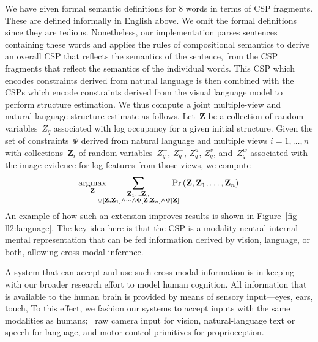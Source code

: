 \par\noindent
We have given formal semantic definitions for $8$ words in terms of CSP
fragments.
%
These are defined informally in English above.
%
We omit the formal definitions since they are tedious.
%
Nonetheless, our implementation parses sentences containing these words and
applies the rules of compositional semantics to derive an overall CSP that
reflects the semantics of the sentence, from the CSP fragments that reflect the
semantics of the individual words.
%
This CSP which encodes constraints derived from natural language is then
combined with the CSPs which encode constraints derived from the visual
language model to perform structure estimation.
%
We thus compute a joint multiple-view and natural-language structure estimate
as follows.
%
Let~$\mathbf{Z}$ be a collection of random variables~$Z_q$ associated with log
occupancy for a given initial structure.
%
Given the set of constraints~$\Psi$ derived from natural language
and multiple views $i=1,\ldots,n$ with collections~$\mathbf{Z}_i$ of random
variables~$Z^+_q$, $Z^-_q$, $Z^u_q$, $Z^v_q$, and~$Z^w_q$ associated with the
image evidence for log features from those views, we compute
%
\begin{equation*}
  \argmax_{\mathbf{Z}}\hspace{-12pt}
  \sum_{\substack{\mathbf{Z}_1\ldots\mathbf{Z}_n\\
      \Phi\left[\mathbf{Z},\mathbf{Z}_1\right]\wedge\cdots\wedge\Phi\left[\mathbf{Z},\mathbf{Z}_n\right]\wedge\Psi\left[\mathbf{Z}\right]}}
  \hspace{-10pt}\Pr\left(\mathbf{Z},\mathbf{Z}_1,\ldots,\mathbf{Z}_n\right)
\end{equation*}
%
An example of how such an extension improves results is shown in
Figure~\ref{fig-ll2:language}.
%
The key idea here is that the CSP is a modality-neutral internal mental
representation that can be fed information derived by vision, language, or
both, allowing cross-modal inference.

A system that can accept and use such cross-modal information is in keeping
with our broader research effort to model human cognition.
%
All information that is available to the human brain is provided by means of
sensory input---eyes, ears, touch, \etc
%
To this effect, we fashion our systems to accept inputs with the same
modalities as humans; \ie\ raw camera input for vision, natural-language text
or speech for language, and motor-control primitives for proprioception.

\par\vspace{-1ex}
